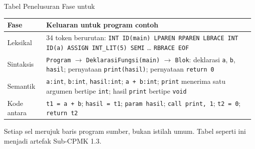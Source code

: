 \documentclass[aspectratio=169,10pt,t]{beamer}
\begin{document}
\begin{frame}{Tabel Penelusuran Fase untuk }
  \scriptsize
  \begin{tabular}{@{}p{2.05cm}p{12.10cm}@{}}
    \toprule
    \textbf{Fase} & \textbf{Keluaran untuk program contoh} \\
    \midrule
    Leksikal & 34 token berurutan: \texttt{INT ID(main) LPAREN RPAREN
      LBRACE INT ID(a) ASSIGN INT\_LIT(5) SEMI} \ldots{}
      \texttt{RBRACE EOF} \\
    Sintaksis & \texttt{Program} $\rightarrow$ \texttt{DeklarasiFungsi(main)}
      $\rightarrow$ \texttt{Blok}: deklarasi \texttt{a}, \texttt{b},
      \texttt{hasil}; pernyataan \texttt{print(hasil)}; pernyataan
      \texttt{return 0} \\
    Semantik & \texttt{a:int}, \texttt{b:int}, \texttt{hasil:int};
      \texttt{a + b:int}; \texttt{print} menerima satu argumen
      bertipe \texttt{int}; hasil \texttt{print} bertipe \texttt{void} \\
    Kode antara & \texttt{t1 = a + b}; \texttt{hasil = t1};
      \texttt{param hasil}; \texttt{call print, 1};
      \texttt{t2 = 0}; \texttt{return t2} \\
    \bottomrule
  \end{tabular}

  \vspace{5pt}
  {\scriptsize\color{ubbblue!75}Setiap sel merujuk baris program sumber,
  bukan istilah umum. Tabel seperti ini menjadi artefak Sub-CPMK 1.3.}
\end{frame}
\end{document}
